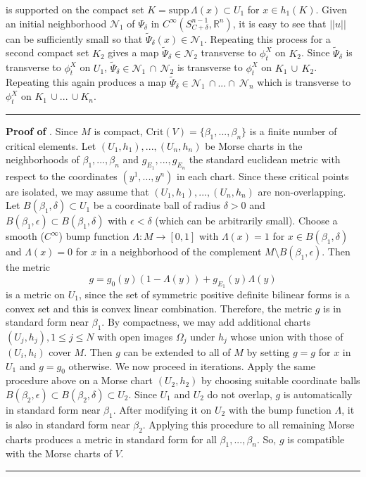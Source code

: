 \documentclass[12pt]{article}
\newcommand{\BlackBox}{\rule{1.5ex}{1.5ex}}  %
\begin{document}
is supported on the compact set $K = \text{supp}\, \Lambda(x) \subset U_1$ for $x \in h_1(K)$. Given an initial neighborhood $\mathcal{N}_1$ of $\Psi_{\delta}$ in $C^{\infty}(S^{n-1}_{C+\delta},\mathbb{R}^n)$, it is easy to see that $|| u ||$ can be sufficiently small so that $\tilde{\Psi}_{\delta}(x) \in \mathcal{N}_1$. Repeating this process for a second compact set $K_2$ gives a map $\tilde{\Psi}_{\delta} \in \mathcal{N}_2$ transverse to $\phi_t^X$ on $K_2$. Since $\tilde{\Psi}_{\delta}$ is transverse to $\phi_t^X$ on $U_1$, $\tilde{\Psi}_{\delta} \in \mathcal{N}_1 \, \cap \, \mathcal{N}_2$ is transverse to $\phi_t^X$ on $K_1 \, \cup \, K_2$. Repeating this again produces a map $\tilde{\Psi}_{\delta} \in \mathcal{N}_1 \, \cap ... \cap \  \mathcal{N}_n$ which is transverse to $\phi_t^X$ on $K_1 \, \cup  ... \, \cup K_n$. \hfill\BlackBox

\vspace{0.5em}
\noindent
{\bf Proof of }.
Since $M$ is compact, $\text{Crit}(V) = \{\beta_1,...,\beta_n\}$ is a finite number of critical elements. Let $(U_1, h_1),..., (U_n, h_n)$ be Morse charts in the neighborhoods of $\beta_1,...,\beta_n$ and $g_{E_1},...,g_{E_n}$ the standard euclidean metric with respect to the coordinates $(y^1,...,y^n)$ in each chart. Since these critical points are isolated, we may assume that $(U_1, h_1),..., (U_n, h_n)$ are non-overlapping. Let $B(\beta_1,\delta)\subset U_1$ be a coordinate ball of radius $\delta >0$ and $B(\beta_1,\epsilon)\subset B(\beta_1,\delta)$ with $\epsilon < \delta$ (which can be arbitrarily small). Choose a smooth ($C^{\infty}$) bump function $\Lambda: M \rightarrow [0,1]$ with $\Lambda(x) = 1$ for $x \in  B(\beta_1,\delta)$ and $\Lambda(x)=0$ for $x$ in a neighborhood of the complement $M \setminus B(\beta_1,\epsilon)$. Then the metric
\begin{equation*}
    g = g_0(y)(1-\Lambda(y)) + g_{E_{1}}(y)\Lambda(y)
\end{equation*}
is a metric on $U_1$, since the set of symmetric positive definite bilinear forms is a convex set and this is convex linear combination. Therefore, the metric $g$ is in standard form near $\beta_1$. By compactness, we may add additional charts $(U_j, h_j), 1\leq j \leq N$ with open images $\Omega_j$ under $h_j$ whose union with those of $(U_i,h_i)$ cover $M$. Then $g$ can be extended to all of $M$ by setting $g = g$ for $x$ in $U_1$ and $g = g_0$ otherwise. We now proceed in iterations. Apply the same procedure above on a Morse chart $(U_2, h_2)$ by choosing suitable coordinate balls $B(\beta_2, \epsilon) \subset B(\beta_2, \delta) \subset U_2$. Since $U_1$ and $U_2$ do not overlap, $g$ is automatically in standard form near $\beta_1$. After modifying it on $U_2$ with the bump function $\Lambda$, it is also in standard form near $\beta_2$. Applying this procedure to all remaining Morse charts produces a metric in standard form for all $\beta_1,...,\beta_n$. So, $g$ is compatible with the Morse charts of $V$.
\hfill\BlackBox
\end{document}
